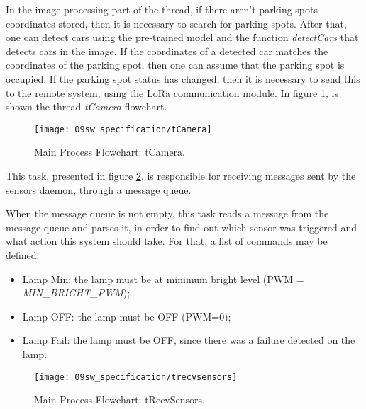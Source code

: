In the image processing part of the thread, if there aren't parking spots coordinates stored, then it is necessary to search for parking spots. After that, one can detect cars using the pre-trained model and the function \textit{detectCars} that detects cars in the image. If the coordinates of a detected car matches the coordinates of the parking spot, then one can assume that the parking spot is occupied. If the parking spot status has changed, then it is necessary to send this to the remote system, using the LoRa communication module. In figure \ref{fig:flow_tcamera}, is shown the thread \textit{tCamera} flowchart.

\begin{figure}[H]
	\centering			
	\texttt{[image: 09sw\_specification/tCamera]}
	\caption{Main Process Flowchart: tCamera.}
	\label{fig:flow_tcamera}
\end{figure}



This task, presented in figure \ref{fig:flow_trecv_sensors}, is responsible for receiving messages sent by the sensors daemon, through a message queue.

When the message queue is not empty, this task reads a message from the message queue and parses it, in order to find out which sensor was triggered and what action this system should take. For that, a list of commands may be defined:
\begin{itemize}
	\item Lamp Min: the lamp must be at minimum bright level (PWM = \textit{MIN\_BRIGHT\_PWM});
	\item Lamp OFF: the lamp must be OFF (PWM=0);
	\item Lamp Fail: the lamp must be OFF, since there was a failure detected on the lamp.
\end{itemize}

\begin{figure}[H]
	\centering			\texttt{[image: 09sw\_specification/trecvsensors]}
	\caption{Main Process Flowchart: tRecvSensors.}
	\label{fig:flow_trecv_sensors}
\end{figure}

\clearpage
{}


